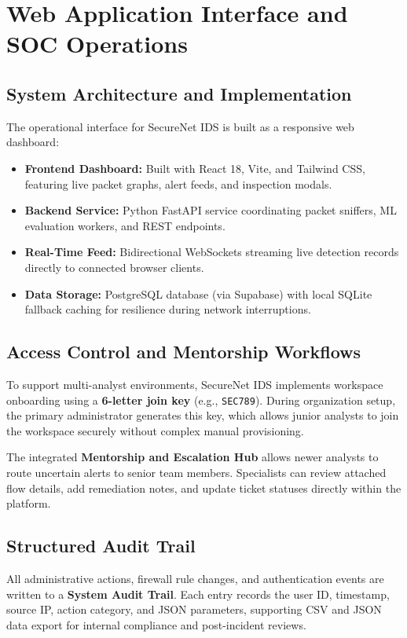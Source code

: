 \documentclass[conference]{IEEEtran}
\begin{document}
\section{Web Application Interface and SOC Operations}

\subsection{System Architecture and Implementation}
The operational interface for SecureNet IDS is built as a responsive web dashboard:
\begin{itemize}
    \item \textbf{Frontend Dashboard:} Built with React 18, Vite, and Tailwind CSS, featuring live packet graphs, alert feeds, and inspection modals.
    \item \textbf{Backend Service:} Python FastAPI service coordinating packet sniffers, ML evaluation workers, and REST endpoints.
    \item \textbf{Real-Time Feed:} Bidirectional WebSockets streaming live detection records directly to connected browser clients.
    \item \textbf{Data Storage:} PostgreSQL database (via Supabase) with local SQLite fallback caching for resilience during network interruptions.
\end{itemize}

\subsection{Access Control and Mentorship Workflows}
To support multi-analyst environments, SecureNet IDS implements workspace onboarding using a \textbf{6-letter join key} (e.g., \texttt{SEC789}). During organization setup, the primary administrator generates this key, which allows junior analysts to join the workspace securely without complex manual provisioning.

The integrated \textbf{Mentorship and Escalation Hub} allows newer analysts to route uncertain alerts to senior team members. Specialists can review attached flow details, add remediation notes, and update ticket statuses directly within the platform.

\subsection{Structured Audit Trail}
All administrative actions, firewall rule changes, and authentication events are written to a \textbf{System Audit Trail}. Each entry records the user ID, timestamp, source IP, action category, and JSON parameters, supporting CSV and JSON data export for internal compliance and post-incident reviews.
\end{document}

